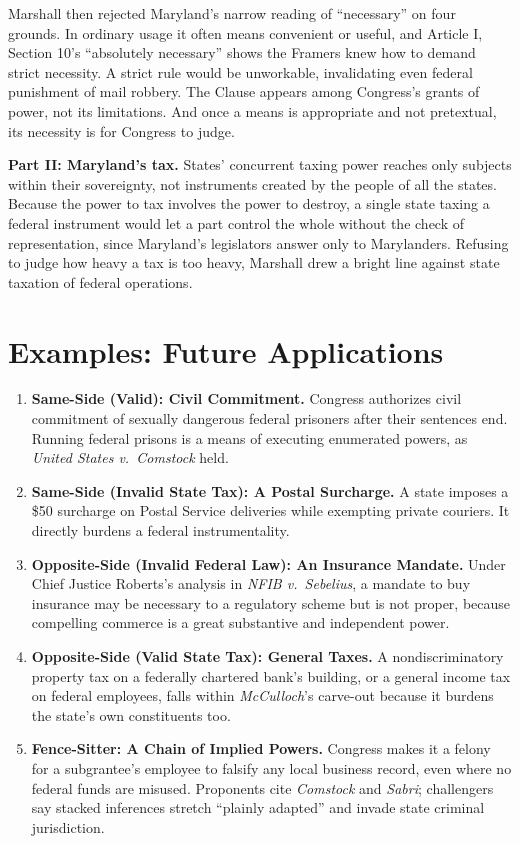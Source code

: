 \documentclass[12pt]{article}
\begin{document}
Marshall then rejected Maryland's narrow reading of ``necessary'' on four grounds. In ordinary usage it often means convenient or useful, and Article I, Section 10's ``absolutely necessary'' shows the Framers knew how to demand strict necessity. A strict rule would be unworkable, invalidating even federal punishment of mail robbery. The Clause appears among Congress's grants of power, not its limitations. And once a means is appropriate and not pretextual, its necessity is for Congress to judge.

\textbf{Part II: Maryland's tax.} States' concurrent taxing power reaches only subjects within their sovereignty, not instruments created by the people of all the states. Because the power to tax involves the power to destroy, a single state taxing a federal instrument would let a part control the whole without the check of representation, since Maryland's legislators answer only to Marylanders. Refusing to judge how heavy a tax is too heavy, Marshall drew a bright line against state taxation of federal operations.

\section{Examples: Future Applications}

\begin{enumerate}
\item \textbf{Same-Side (Valid): Civil Commitment.} Congress authorizes civil commitment of sexually dangerous federal prisoners after their sentences end. Running federal prisons is a means of executing enumerated powers, as \textit{United States v.\ Comstock} held.
\item \textbf{Same-Side (Invalid State Tax): A Postal Surcharge.} A state imposes a \$50 surcharge on Postal Service deliveries while exempting private couriers. It directly burdens a federal instrumentality.
\item \textbf{Opposite-Side (Invalid Federal Law): An Insurance Mandate.} Under Chief Justice Roberts's analysis in \textit{NFIB v.\ Sebelius}, a mandate to buy insurance may be necessary to a regulatory scheme but is not proper, because compelling commerce is a great substantive and independent power.
\item \textbf{Opposite-Side (Valid State Tax): General Taxes.} A nondiscriminatory property tax on a federally chartered bank's building, or a general income tax on federal employees, falls within \textit{McCulloch}'s carve-out because it burdens the state's own constituents too.
\item \textbf{Fence-Sitter: A Chain of Implied Powers.} Congress makes it a felony for a subgrantee's employee to falsify any local business record, even where no federal funds are misused. Proponents cite \textit{Comstock} and \textit{Sabri}; challengers say stacked inferences stretch ``plainly adapted'' and invade state criminal jurisdiction.
\end{enumerate}
\end{document}
